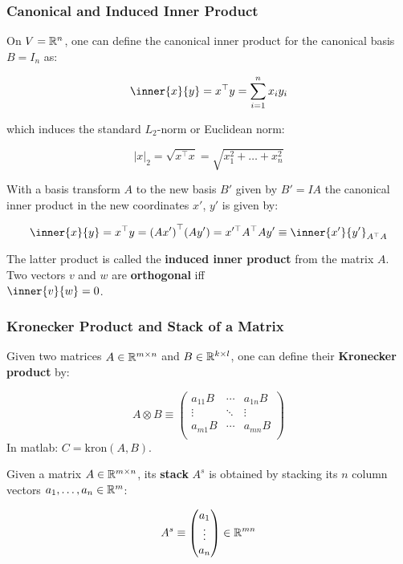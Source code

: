 \subsubsection{Canonical and Induced Inner Product}
\label{ssub:canonical_and_induced_inner_product}

On $V = \mathbb{R}^n$, one can define the canonical inner product for
the canonical basis $B = I_n$ as:

\[\inner{x}{y} = x^{\top} y = \sum_{i=1}^n x_i y_i\]

\noindent
which induces the standard $L_2$-norm or Euclidean norm:

\[|x|_2 = \sqrt{x^{\top}x} = \sqrt{x_1^2 + \hdots + x_n^2}\]

\noindent
With a basis transform $A$ to the new basis $B'$ given by
$B' = IA$ the canonical inner product in the new coordinates
$x'$, $y'$ is given by:

\[\inner{x}{y} = x^{\top} y = {(Ax')}^{\top} (Ay')
= x'^{\top} A^{\top} Ay' \equiv \inner{x'}{y'}_{A^{\top} A}\]

\noindent
The latter product is called the \textbf{induced inner product}
from the matrix $A$.\\

\noindent
Two vectors $v$ and $w$ are \textbf{orthogonal} iff\\
$\inner{v}{w} = 0$.


\subsubsection{Kronecker Product and Stack of a Matrix}
\label{ssub:kronecker_product_and_stack_of_a_matrix}

Given two matrices $A \in \mathbb{R}^{m\times n}$ and $B \in \mathbb{R}^{k \times l}$,
one can define their \textbf{Kronecker product} by:

\[A \otimes B \equiv
	\begin{pmatrix}
		a_{11}B & \cdots & a_{1n}B \\
		\vdots & \ddots & \vdots \\
		a_{m1}B & \cdots & a_{mn}B \\
	\end{pmatrix}
\]
\noindent
In matlab: $C = \mathrm{kron}(A,B)$.

\noindent
Given a matrix $A \in \mathbb{R}^{m \times n}$, its \textbf{stack} $A^s$
is obtained by stacking its $n$ column vectors $a_1, \ldots, a_n \in \mathbb{R}^m$:

\[A^s \equiv
	\begin{pmatrix}
		a_1 \\
		\vdots \\
		a_n \\
	\end{pmatrix}
\in \mathbb{R}^{mn}\]

